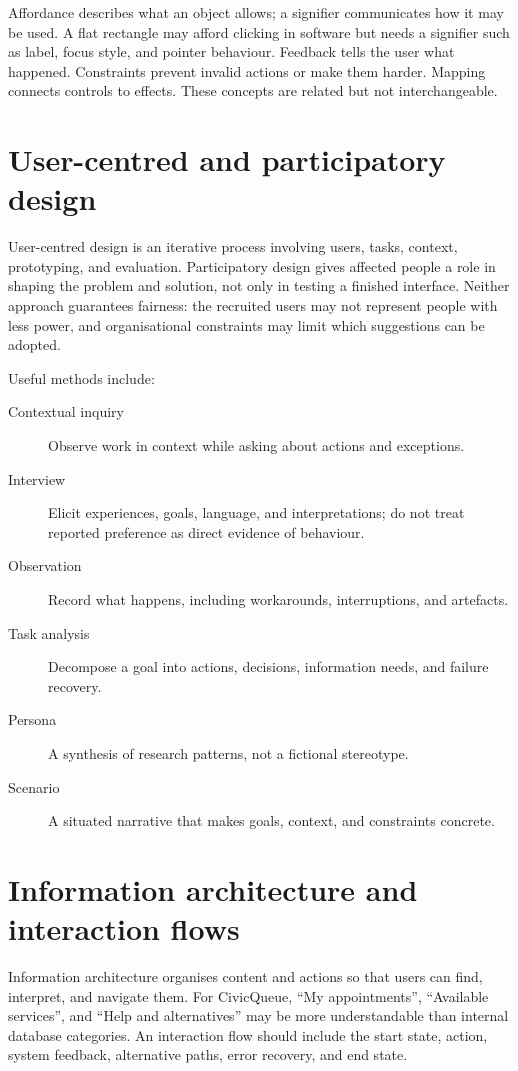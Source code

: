 Affordance describes what an object allows; a signifier communicates how it may be used. A flat rectangle may afford clicking in software but needs a signifier such as label, focus style, and pointer behaviour. Feedback tells the user what happened. Constraints prevent invalid actions or make them harder. Mapping connects controls to effects. These concepts are related but not interchangeable.

\section{User-centred and participatory design}
User-centred design is an iterative process involving users, tasks, context, prototyping, and evaluation. Participatory design gives affected people a role in shaping the problem and solution, not only in testing a finished interface. Neither approach guarantees fairness: the recruited users may not represent people with less power, and organisational constraints may limit which suggestions can be adopted.

Useful methods include:
\begin{description}
\item[Contextual inquiry] Observe work in context while asking about actions and exceptions.
\item[Interview] Elicit experiences, goals, language, and interpretations; do not treat reported preference as direct evidence of behaviour.
\item[Observation] Record what happens, including workarounds, interruptions, and artefacts.
\item[Task analysis] Decompose a goal into actions, decisions, information needs, and failure recovery.
\item[Persona] A synthesis of research patterns, not a fictional stereotype.
\item[Scenario] A situated narrative that makes goals, context, and constraints concrete.
\end{description}

\section{Information architecture and interaction flows}
Information architecture organises content and actions so that users can find, interpret, and navigate them. For CivicQueue, \enquote{My appointments}, \enquote{Available services}, and \enquote{Help and alternatives} may be more understandable than internal database categories. An interaction flow should include the start state, action, system feedback, alternative paths, error recovery, and end state.

